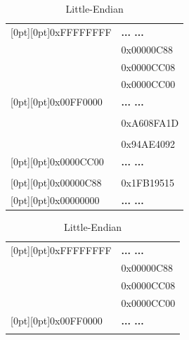 \documentclass[addpoints, 12pt, answers]{exam}
\begin{document}
\begin{questions}
\begin{parts}
\begin{table}[h]
\vspace{1em}
\renewcommand{\arraystretch}{1.5}
\begin{minipage}[t]{0.5\textwidth}
\centering
\begin{tabular}{l|l|}
\cline{2-2}
\raisebox{2ex}[0pt][0pt]{0xFFFFFFFF}  &{\bf... ...}\\ \cline{2-2}
                                      & 0x00000C88 \\ \cline{2-2}
                                      & 0x0000CC08 \\ \cline{2-2}
                                      & 0x0000CC00 \\ \cline{2-2}
\raisebox{2ex}[0pt][0pt]{0x00FF0000}  &{\bf... ...}\\ \cline{2-2}
                                      &            \\ \cline{2-2}
                                      & 0xA608FA1D \\ \cline{2-2}
                                      &            \\ \cline{2-2}
                                      & 0x94AE4092 \\ \cline{2-2}
\raisebox{2ex}[0pt][0pt]{0x0000CC00}  &{\bf... ...}\\ \cline{2-2}
                                      &            \\ \cline{2-2}
\raisebox{-2ex}[0pt][0pt]{0x00000C88} & 0x1FB19515 \\ \cline{2-2}
\raisebox{-2ex}[0pt][0pt]{0x00000000} &{\bf... ...}\\ \cline{2-2}
\end{tabular}
\caption*{Little-Endian}
\end{minipage}
\hfill
\begin{minipage}[t]{0.5\textwidth}
\centering
\begin{tabular}{l|l|}
\cline{2-2}
\raisebox{2ex}[0pt][0pt]{0xFFFFFFFF}  &{\bf... ...}\\ \cline{2-2}
                                      & 0x00000C88 \\ \cline{2-2}
                                      & 0x0000CC08 \\ \cline{2-2}
                                      & 0x0000CC00 \\ \cline{2-2}
\raisebox{2ex}[0pt][0pt]{0x00FF0000}  &{\bf... ...}\\ \cline{2-2}
                                      &            \\ \cline{2-2}

\end{tabular}
\end{minipage}
\end{table}
\end{parts}
\end{questions}
\end{document}
